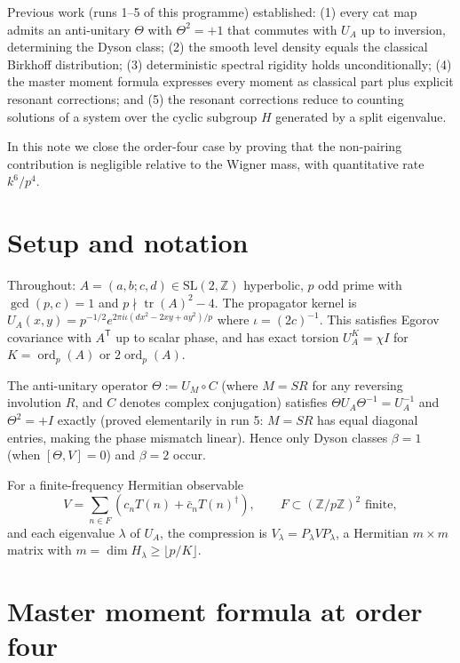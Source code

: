 \documentclass[11pt]{article}
\numberwithin{equation}{section}
\begin{document}
Previous work (runs 1--5 of this programme) established:
(1) every cat map admits an anti-unitary $\Theta$ with $\Theta^2=+1$
that commutes with $U_A$ up to inversion, determining the Dyson class;
(2) the smooth level density equals the classical Birkhoff distribution;
(3) deterministic spectral rigidity holds unconditionally;
(4) the master moment formula expresses every moment as classical part
plus explicit resonant corrections; and
(5) the resonant corrections reduce to counting solutions of a system
over the cyclic subgroup $H$ generated by a split eigenvalue.

In this note we close the order-four case by proving that the
non-pairing contribution is negligible relative to the Wigner mass,
with quantitative rate $k^6/p^4$.

\section{Setup and notation}\label{sec:setup}

Throughout: $A = (a,b;c,d) \in \mathrm{SL}(2,\mathbb Z)$ hyperbolic,
$p$ odd prime with $\gcd(p,c)=1$ and $p \nmid \operatorname{tr}(A)^2 -
4$.  The propagator kernel is $U_A(x,y) = p^{-1/2}e^{2\pi i\iota(dx^2 -
2xy + ay^2)/p}$ where $\iota = (2c)^{-1}$.  This satisfies Egorov
covariance with $A^{\mathsf T}$ up to scalar phase, and has exact
torsion $U_A^K = \chi I$ for $K = \operatorname{ord}_p(A)$ or
$2\operatorname{ord}_p(A)$.

The anti-unitary operator $\Theta := U_M \circ C$ (where $M = SR$ for
any reversing involution $R$, and $C$ denotes complex conjugation)
satisfies $\Theta U_A \Theta^{-1} = U_A^{-1}$ and $\Theta^2 = +I$
exactly (proved elementarily in run 5: $M=SR$ has equal diagonal
entries, making the phase mismatch linear).  Hence only Dyson classes
$\beta=1$ (when $[\Theta,V]=0$) and $\beta=2$ occur.

For a finite-frequency Hermitian observable
\[
V = \sum_{n \in F} (c_n T(n) + \bar c_n T(n)^{\dagger}),\qquad
F \subset (\mathbb Z/p\mathbb Z)^2 \text{ finite},
\]
and each eigenvalue $\lambda$ of $U_A$, the compression is
$V_\lambda = P_\lambda V P_\lambda$, a Hermitian $m\times m$ matrix
with $m = \dim H_\lambda \ge \lfloor p/K\rfloor$.

\section{Master moment formula at order four}
\end{document}
